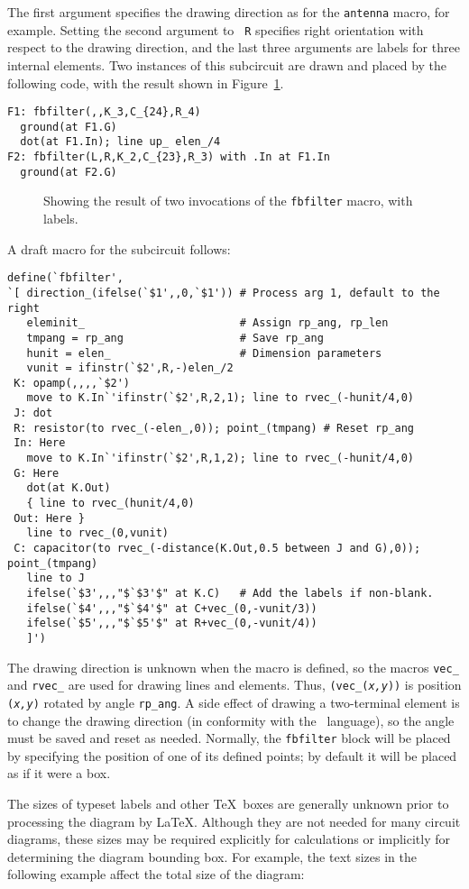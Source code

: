 \noindent The first argument specifies the drawing direction as for the
{\tt antenna} macro, for example.  Setting the second argument to {\tt
R} specifies right orientation with respect to the drawing direction,
and the last three arguments are labels
for three internal elements.  Two instances of this subcircuit are
drawn and placed by the following code, with the result
shown in Figure~\ref{fbfilter}.
\begin{verbatim}
F1: fbfilter(,,K_3,C_{24},R_4)
  ground(at F1.G)
  dot(at F1.In); line up_ elen_/4
F2: fbfilter(L,R,K_2,C_{23},R_3) with .In at F1.In
  ground(at F2.G)
\end{verbatim}
\begin{figure}[hbt]
   
   \caption{Showing the result of two invocations of the {\tt fbfilter} macro,
     with labels.}
   \label{fbfilter}
   \end{figure}
A draft macro for the subcircuit follows:
\begin{verbatim}
define(`fbfilter',
`[ direction_(ifelse(`$1',,0,`$1')) # Process arg 1, default to the right
   eleminit_                        # Assign rp_ang, rp_len
   tmpang = rp_ang                  # Save rp_ang 
   hunit = elen_                    # Dimension parameters
   vunit = ifinstr(`$2',R,-)elen_/2
 K: opamp(,,,,`$2')
   move to K.In`'ifinstr(`$2',R,2,1); line to rvec_(-hunit/4,0)
 J: dot
 R: resistor(to rvec_(-elen_,0)); point_(tmpang) # Reset rp_ang
 In: Here
   move to K.In`'ifinstr(`$2',R,1,2); line to rvec_(-hunit/4,0)
 G: Here
   dot(at K.Out)
   { line to rvec_(hunit/4,0)
 Out: Here } 
   line to rvec_(0,vunit)
 C: capacitor(to rvec_(-distance(K.Out,0.5 between J and G),0)); point_(tmpang)
   line to J
   ifelse(`$3',,,"$`$3'$" at K.C)   # Add the labels if non-blank.
   ifelse(`$4',,,"$`$4'$" at C+vec_(0,-vunit/3))
   ifelse(`$5',,,"$`$5'$" at R+vec_(0,-vunit/4))
   ]')
\end{verbatim}
The drawing direction is unknown when the macro is defined, so the
macros {\tt vec\_} and {\tt rvec\_} are used for drawing lines and
elements.
Thus, {\tt (vec\_({\sl x,y}))} is position {\tt ({\sl x,y})} rotated
by angle {\tt rp\_ang}.
A side effect of drawing a two-terminal element is to change the
drawing direction (in conformity with the \pic\ language), so the angle must
be saved and reset as needed. Normally, the {\tt fbfilter} block will be
placed by specifying the position of one of its defined points; by
default it will be placed as if it were a box.

\label{Interaction:}
The sizes of typeset labels and other \TeX\ boxes are generally unknown
prior to processing the diagram by \LaTeX.
Although they are not needed for many circuit diagrams,
these sizes may be required explicitly for calculations or implicitly
for determining the diagram bounding box.  For example, the 
text sizes in the following example affect the total size of the diagram:

